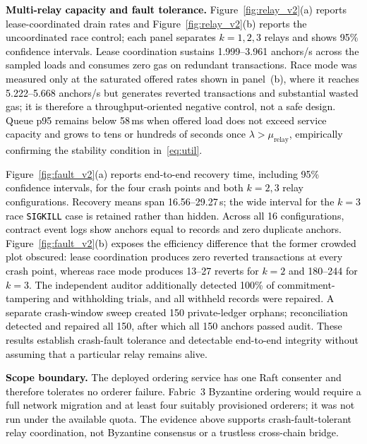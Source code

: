 \documentclass[final,5p,times,twocolumn]{elsarticle}
\begin{document}
\textcolor{black}{\textbf{Multi-relay capacity and fault tolerance.} Figure~\ref{fig:relay_v2}(a) reports lease-coordinated drain rates and Figure~\ref{fig:relay_v2}(b) reports the uncoordinated race control; each panel separates $k=1,2,3$ relays and shows 95\% confidence intervals. Lease coordination sustains 1.999--3.961 anchors/s across the sampled loads and consumes zero gas on redundant transactions. Race mode was measured only at the saturated offered rates shown in panel~(b), where it reaches 5.222--5.668 anchors/s but generates reverted transactions and substantial wasted gas; it is therefore a throughput-oriented negative control, not a safe design. Queue p95 remains below 58\,ms when offered load does not exceed service capacity and grows to tens or hundreds of seconds once $\lambda>\mu_{\mathrm{relay}}$, empirically confirming the stability condition in~\eqref{eq:util}.}


\textcolor{black}{Figure~\ref{fig:fault_v2}(a) reports end-to-end recovery time, including 95\% confidence intervals, for the four crash points and both $k=2,3$ relay configurations. Recovery means span 16.56--29.27\,s; the wide interval for the $k=3$ race \texttt{SIGKILL} case is retained rather than hidden. Across all 16 configurations, contract event logs show anchors equal to records and zero duplicate anchors. Figure~\ref{fig:fault_v2}(b) exposes the efficiency difference that the former crowded plot obscured: lease coordination produces zero reverted transactions at every crash point, whereas race mode produces 13--27 reverts for $k=2$ and 180--244 for $k=3$. The independent auditor additionally detected 100\% of commitment-tampering and withholding trials, and all withheld records were repaired. A separate crash-window sweep created 150 private-ledger orphans; reconciliation detected and repaired all 150, after which all 150 anchors passed audit. These results establish crash-fault tolerance and detectable end-to-end integrity without assuming that a particular relay remains alive.}



\textcolor{black}{\textbf{Scope boundary.} The deployed ordering service has one Raft consenter and therefore tolerates no orderer failure. Fabric~3 Byzantine ordering would require a full network migration and at least four suitably provisioned orderers; it was not run under the available quota. The evidence above supports crash-fault-tolerant relay coordination, not Byzantine consensus or a trustless cross-chain bridge.}

\iffalse
\end{document}
